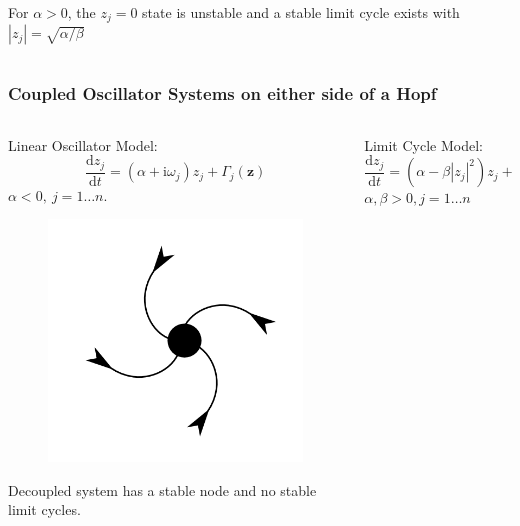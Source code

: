 \documentclass[10pt,reqno]{beamer}
\newcommand{\D}[2]{\frac{\mathrm{d} #1}{\mathrm{d} #2}}
\newcommand{\I}{\mathrm{i}}
\begin{document}
\begin{frame}
\begin{columns}[t]
\begin{column}{.49\textwidth}
\begin{figure}
\end{figure}
For $\alpha>0$, the $z_j=0$ state is unstable and a stable limit cycle exists with $|z_j| = \sqrt{\alpha/\beta}$				
\end{column}
\end{columns}
\end{frame}
\begin{frame}
\frametitle{Coupled Oscillator Systems on either side of a Hopf}
\begin{columns}[t]
\begin{column}{.49\textwidth}
\centering
Linear Oscillator Model:
\[
\D{z_j}{t} = (\alpha +\I\omega_j)z_j+\Gamma_j(\mathbf{z})
\]
$\alpha <0,\ j = 1\dots n$.
\begin{figure}
\includegraphics[scale = 0.16]{node.png}
\end{figure}
Decoupled system has a stable node and no stable limit cycles.
\end{column}
\begin{column}{.49\textwidth}
\centering
Limit Cycle Model:
\[
\D{z_j}{t} = (\alpha - \beta|z_j|^2)z_j + \I\omega_jz_j +\Gamma_j(\mathbf{z})
\]
$\alpha,\beta>0, j = 1\dots n$
\begin{figure}

\end{figure}
\end{column}
\end{columns}
\end{frame}
\end{document}
